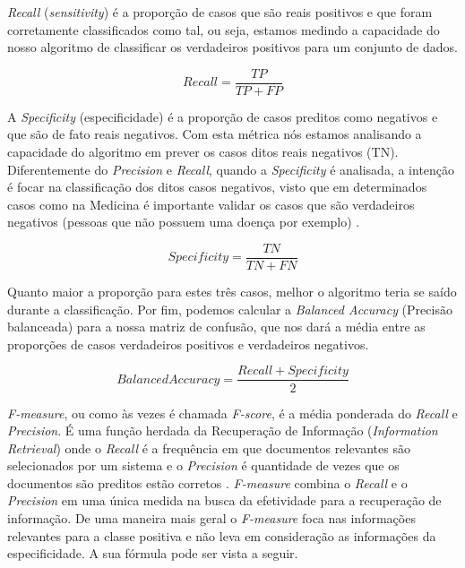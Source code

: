 \textit{Recall} (\textit{sensitivity}) é a proporção de casos que são reais positivos e que foram corretamente classificados como tal, ou seja, estamos medindo a capacidade do nosso algoritmo de classificar os verdadeiros positivos para um conjunto de dados.

\begin{equation}
Recall  = \frac{TP}{TP + FP}
\end{equation}


A \textit{Specificity} (especificidade) é a proporção de casos preditos como negativos e que são de fato reais negativos. Com esta métrica nós estamos analisando a capacidade do algoritmo em prever os casos ditos reais negativos (TN). Diferentemente do \textit{Precision} e \textit{Recall}, quando a \textit{Specificity} é analisada, a intenção é focar na classificação dos ditos casos negativos, visto que em determinados casos como na Medicina é importante validar os casos que são verdadeiros negativos (pessoas que não possuem uma doença por exemplo) \cite{Holzinger2014}.

\begin{equation}
Specificity  = \frac{TN}{TN + FN}
\end{equation}

Quanto maior a proporção para estes três casos, melhor o algoritmo teria se saído durante a classificação. Por fim, podemos calcular a \textit{Balanced Accuracy} (Precisão balanceada) para a nossa matriz de confusão, que nos dará a média entre as proporções de casos verdadeiros positivos e verdadeiros negativos.

\begin{equation}
Balanced Accuracy  = \frac{Recall + Specificity}{2}
\end{equation}

\textit{F-measure}, ou como às vezes é chamada \textit{F-score}, é a média ponderada do \textit{Recall} e \textit{Precision}. É uma função herdada da Recuperação de Informação (\textit{Information Retrieval}) onde o \textit{Recall} é a frequência em que documentos relevantes são selecionados por um sistema e o \textit{Precision} é quantidade de vezes que os documentos são preditos estão corretos \cite{Powers2014}. \textit{F-measure} combina o \textit{Recall} e o \textit{Precision} em uma única medida na busca da efetividade para a recuperação de informação. De uma maneira mais geral o \textit{F-measure} foca nas informações relevantes para a classe positiva e não leva em consideração as informações da especificidade. A sua fórmula pode ser vista a seguir.

